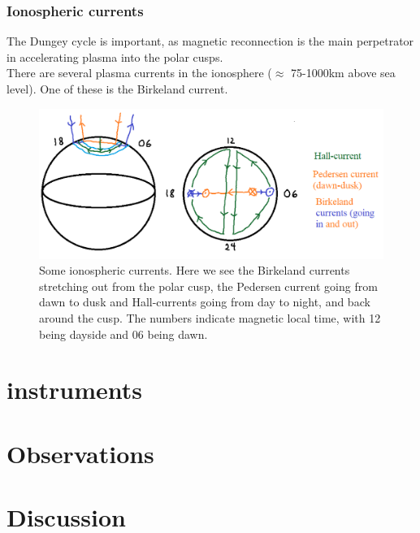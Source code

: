 \documentclass[norsk,a4paper,12pt]{article}
\begin{document}
	\subsubsection{Ionospheric currents}
	The Dungey cycle is important, as magnetic reconnection is the main perpetrator in accelerating plasma into the polar cusps.\\
	There are several plasma currents in the ionosphere ($\approx$ 75-1000km above sea level). One of these is the Birkeland current.
	\begin{figure}[H]
		\includegraphics[scale = 0.5]{Figures/ionosphere_currents.png}
		\centering
		\caption{Some ionospheric currents. Here we see the Birkeland currents stretching out from the polar cusp, the Pedersen current going from dawn to 						dusk and Hall-currents going from day to night, and back around the cusp. The numbers indicate magnetic local time, with 12 being dayside 			and 06 being dawn.}
	\end{figure}



\section{instruments} %
\label{sec:instruments}





\section{Observations} %
\label{sec:observations}



 


\section{Discussion} %
\label{sec:discussion}
\end{document}
